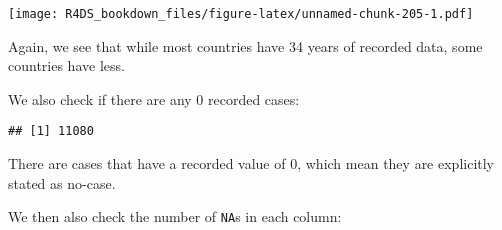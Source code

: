 \documentclass[]{article}
\newenvironment{Shaded}{\begin{snugshade}}{\end{snugshade}}
\newcommand{\KeywordTok}[1]{\textcolor[rgb]{0.13,0.29,0.53}{\textbf{#1}}}
\newcommand{\DataTypeTok}[1]{\textcolor[rgb]{0.13,0.29,0.53}{#1}}
\newcommand{\DecValTok}[1]{\textcolor[rgb]{0.00,0.00,0.81}{#1}}
\newcommand{\StringTok}[1]{\textcolor[rgb]{0.31,0.60,0.02}{#1}}
\newcommand{\OtherTok}[1]{\textcolor[rgb]{0.56,0.35,0.01}{#1}}
\newcommand{\ControlFlowTok}[1]{\textcolor[rgb]{0.13,0.29,0.53}{\textbf{#1}}}
\newcommand{\OperatorTok}[1]{\textcolor[rgb]{0.81,0.36,0.00}{\textbf{#1}}}
\newcommand{\NormalTok}[1]{#1}
\theoremstyle{definition}
\theoremstyle{definition}
\theoremstyle{definition}
\theoremstyle{remark}
\begin{document}
\texttt{[image: R4DS\_bookdown\_files/figure-latex/unnamed-chunk-205-1.pdf]}

Again, we see that while most countries have 34 years of recorded data,
some countries have less.

We also check if there are any 0 recorded cases:

\begin{Shaded}
\end{Shaded}

\begin{verbatim}
## [1] 11080
\end{verbatim}

There are cases that have a recorded value of 0, which mean they are
explicitly stated as no-case.

We then also check the number of \texttt{NA}s in each column:

\begin{Shaded}
\end{Shaded}
\end{document}
